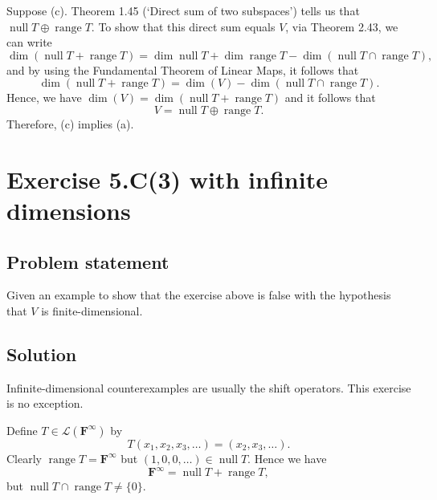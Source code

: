 \documentclass{article}
\begin{document}
Suppose (c). 
Theorem 1.45 (`Direct sum of two subspaces') tells us that $\operatorname{null}T\oplus\operatorname{range}T$. 
To show that this direct sum equals $V$, via Theorem 2.43, we can write
\[\dim(\operatorname{null}T+\operatorname{range}T)=\dim\operatorname{null}T+\dim\operatorname{range}T-\dim(\operatorname{null}T\cap \operatorname{range}T),\]
and by using the Fundamental Theorem of Linear Maps, it follows that
\[\dim(\operatorname{null}T+\operatorname{range}T)=\dim(V)-\dim(\operatorname{null}T\cap \operatorname{range}T).\]
Hence, we have $\dim(V)=\dim(\operatorname{null}T+\operatorname{range}T)$ and it follows that 
\[V=\operatorname{null}T\oplus\operatorname{range}T.\]
Therefore, (c) implies (a).

\clearpage

\section{Exercise 5.C(3) with infinite dimensions}
\subsection*{Problem statement}
Given an example to show that the exercise above is false with the hypothesis that $V$ is finite-dimensional.

\subsection*{Solution}
Infinite-dimensional counterexamples are usually the shift operators. 
This exercise is no exception.

Define $T\in\mathcal{L}(\mathbf{F}^\infty)$ by
\[T(x_1,x_2,x_3,\ldots)=(x_2,x_3,\ldots).\]
Clearly $\operatorname{range}T=\mathbf{F}^\infty$ but $(1,0,0,\ldots)\in\operatorname{null}T$. 
Hence we have
\[\mathbf{F}^\infty=\operatorname{null}T+\operatorname{range}T,\]
but $\operatorname{null}T\cap \operatorname{range}T\neq \{0\}.$
\end{document}

